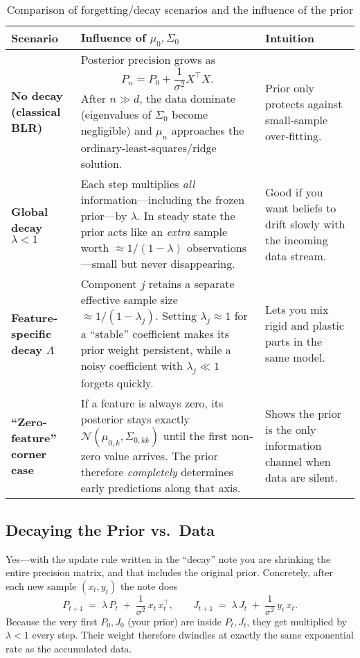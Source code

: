 \documentclass[11pt]{article}
\begin{document}
\begin{table}[ht]
  \small
  \centering
  \begin{tabularx}{\textwidth}{l X X}
    \toprule
    Scenario & Influence of \(\mu_0,\Sigma_0\) & Intuition \\
    \midrule
    \textbf{No decay (classical BLR)}
      & Posterior precision grows as
        \[
          P_n = P_0 + \frac{1}{\sigma^2} X^\top X.
        \]
        After \(n \gg d\), the data dominate (eigenvalues of \(\Sigma_0\) become negligible)
        and \(\mu_n\) approaches the ordinary‐least‐squares/ridge solution.
      & Prior only protects against small‐sample over‐fitting. \\[1ex]
    \textbf{Global decay \(\lambda<1\)}
      & Each step multiplies \emph{all} information—including the frozen prior—by \(\lambda\).
        In steady state the prior acts like an \emph{extra} sample worth
        \(\approx1/(1-\lambda)\) observations—small but never disappearing.
      & Good if you want beliefs to drift slowly with the incoming data stream. \\[1ex]
    \textbf{Feature‐specific decay \(\Lambda\)}
      & Component \(j\) retains a separate effective sample size \(\approx1/(1-\lambda_j)\).
        Setting \(\lambda_j\approx1\) for a “stable” coefficient makes its prior weight persistent,
        while a noisy coefficient with \(\lambda_j\ll1\) forgets quickly.
      & Lets you mix rigid and plastic parts in the same model. \\[1ex]
    \textbf{“Zero‐feature” corner case}
      & If a feature is always zero, its posterior stays exactly
        \(\mathcal{N}(\mu_{0,k},\Sigma_{0,kk})\) until the first non‐zero value arrives.
        The prior therefore \emph{completely} determines early predictions along that axis.
      & Shows the prior is the only information channel when data are silent. \\
    \bottomrule
  \end{tabularx}
  \caption{Comparison of forgetting/decay scenarios and the influence of the prior}
  \label{tab:decay-scenarios}
\end{table}


\subsection{Decaying the Prior vs.\ Data}

Yes—with the update rule written in the “decay” note you are shrinking the entire precision matrix, and that includes the original prior.  Concretely, after each new sample \((x_t,y_t)\) the note does
\[
P_{t+1} \;=\; \lambda\,P_t \;+\;\frac{1}{\sigma^2}\,x_t\,x_t^\top,
\qquad
J_{t+1} \;=\; \lambda\,J_t \;+\;\frac{1}{\sigma^2}\,y_t\,x_t.
\]
Because the very first \(P_0,J_0\) (your prior) are inside \(P_t,J_t\), they get multiplied by \(\lambda<1\) every step.  Their weight therefore dwindles at exactly the same exponential rate as the accumulated data.
\end{document}
